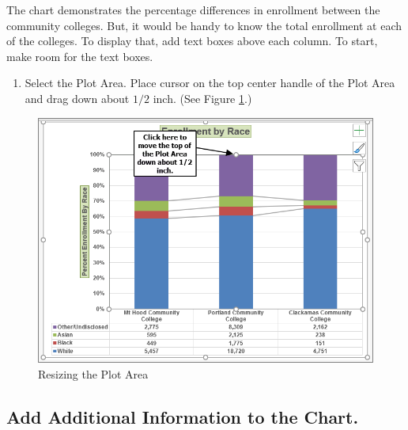 The chart demonstrates the percentage differences in enrollment between the community colleges. But, it would be handy to know the total enrollment at each of the colleges. To display that, add text boxes above each column. To start, make room for the text boxes.

\begin{enumerate}
	\item Select the Plot Area. Place cursor on the top center handle of the Plot Area and drag down about $ 1/2 $ inch. (See Figure \ref{04:fig41}.)
\end{enumerate}

\begin{figure}[H]
	\centering
	\includegraphics[width=\maxwidth{.95\linewidth}]{gfx/ch04_fig41}
	\caption{Resizing the Plot Area}
	\label{04:fig41}
\end{figure}

\subsection{Add Additional Information to the Chart.}

